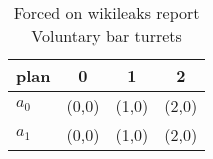 \documentclass[a4paper]{article}
\begin{document}
\begin{table}
\begin{adjustbox}{width=0.6\columnwidth}
\begin{tabular}{|l|l|l|l|}
\hline
\textbf{plan} & \multicolumn{1}{c|}{\textbf{0}} & \multicolumn{1}{c|}{\textbf{1}} & \multicolumn{1}{c|}{\textbf{2}} \\ \hline
\textbf{$a_0$}  & (0,0) & (1,0) & (2,0) \\ \hline
\textbf{$a_1$}  & (0,0) & (1,0) & (2,0) \\ \hline
\end{tabular}
\end{adjustbox}
\caption{Forced on wikileaks report Voluntary bar turrets 
}
\end{table}
\end{document}

